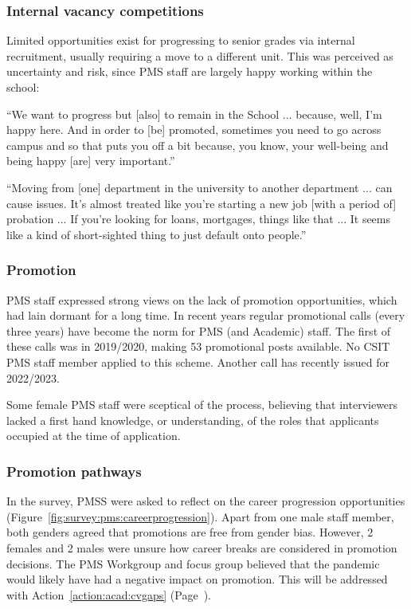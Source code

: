 \subsubsection{Internal vacancy competitions}
Limited opportunities exist for progressing to senior grades via internal recruitment, usually requiring a move to a different unit.  This was perceived as uncertainty and risk, since PMS staff are largely happy working within the school: 



\begin{myquote}
    ``We want to progress but [also] to remain in the School ... because, well, I'm happy here.  And in order to [be] promoted, sometimes you need to go across campus and so that puts you off a bit because, you know, your well-being and being happy [are] very important.''
\end{myquote}

\begin{myquote}
     ``Moving from [one] department in the university to another department ... can cause issues.  It's almost treated like you're starting a new job [with a period of] probation ... If you're looking for loans, mortgages, things like that ... It seems like a kind of short-sighted thing to just default onto people.''
 \end{myquote}

\subsubsection{Promotion}
PMS staff expressed strong views on the lack of promotion opportunities, which had lain dormant for a long time. In recent years regular promotional calls (every three years) have become the norm for  PMS (and Academic) staff. The first of these calls was in 2019/2020, making 53 promotional posts available. No CSIT PMS staff member applied to this scheme. Another call has recently issued for 2022/2023. 

Some female PMS staff were sceptical of the process,  believing that interviewers lacked a first hand knowledge, or understanding, of the roles that applicants occupied at the time of application.


\subsubsection{Promotion pathways}

In the survey, PMSS were asked to reflect on the career progression opportunities (Figure~\ref{fig:survey:pms:careerprogression}). Apart from one male staff member, both genders agreed that promotions are free from gender bias. 
However, 2 females and 2 males were unsure how career breaks are considered in promotion decisions. The PMS Workgroup and focus group believed that the pandemic would likely have had a negative impact on promotion. This will be addressed with Action~\ref{action:acad:cvgaps} (Page~\pageref{action:acad:cvgaps}). 


